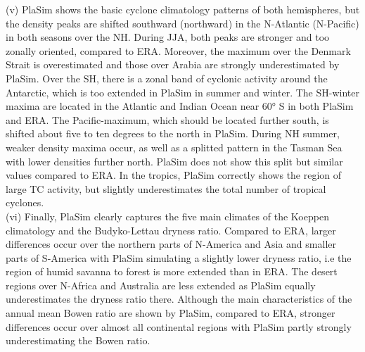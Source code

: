 (v) PlaSim shows the basic cyclone climatology patterns of both hemispheres, but the density peaks are shifted southward (northward) in the N-Atlantic (N-Pacific) in both seasons over the NH. During JJA, both peaks are stronger and too zonally oriented, compared to ERA. Moreover, the maximum over the Denmark Strait is overestimated and those over Arabia are strongly underestimated by PlaSim. Over the SH, there is a zonal band of cyclonic activity around the Antarctic, which is too extended in PlaSim in summer and winter. The SH-winter maxima are located in the Atlantic and Indian Ocean near 60° S in both PlaSim and ERA. The Pacific-maximum, which should be located further south, is shifted about five to ten degrees to the north in PlaSim. During NH summer, weaker density maxima occur, as well as a splitted pattern in the Tasman Sea with lower densities further north. PlaSim does not show this split but similar values compared to ERA. In the tropics, PlaSim correctly shows the region of large TC activity, but slightly underestimates the total number of tropical cyclones.\\   
(vi) Finally, PlaSim clearly captures the five main climates of the Koeppen climatology and the Budyko-Lettau dryness ratio.
Compared to ERA, larger differences occur over the northern parts of N-America and Asia and smaller parts of S-America with PlaSim simulating a slightly lower dryness ratio, i.e the region of humid savanna to forest is more extended than in ERA. The desert regions over N-Africa and Australia are less extended as PlaSim equally underestimates the dryness ratio there. Although the main characteristics of the annual mean Bowen ratio are shown by PlaSim, compared to ERA, stronger differences occur over almost all continental regions with PlaSim partly strongly underestimating the Bowen ratio.


























